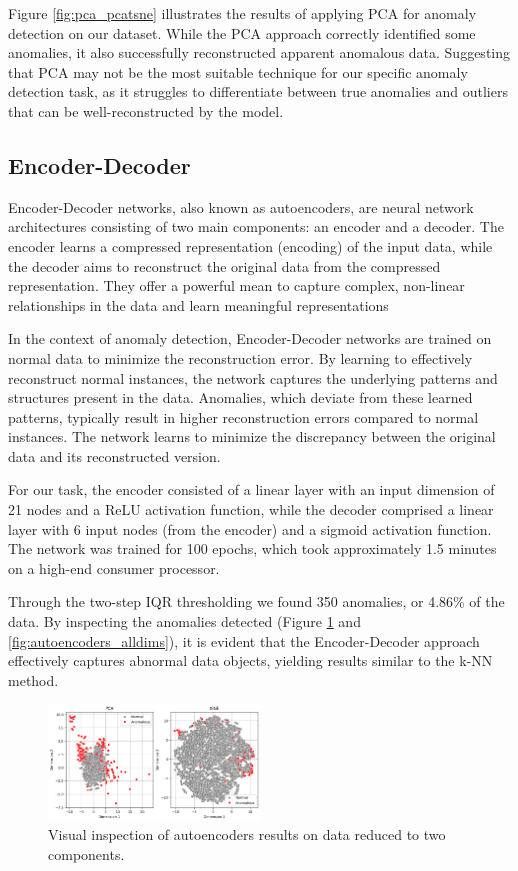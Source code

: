 \documentclass[9pt,twocolumn]{article}
\begin{document}
Figure \ref{fig:pca_pcatsne} illustrates the results of applying PCA for anomaly detection on our dataset. While the PCA approach correctly identified some anomalies, it also successfully reconstructed apparent anomalous data. Suggesting that PCA may not be the most suitable technique for our specific anomaly detection task, as it struggles to differentiate between true anomalies and outliers that can be well-reconstructed by the model.

\subsection {Encoder-Decoder}
Encoder-Decoder networks, also known as autoencoders, are neural network architectures consisting of two main components: an encoder and a decoder. The encoder learns a compressed representation (encoding) of the input data, while the decoder aims to reconstruct the original data from the compressed representation. They offer a powerful mean to capture complex, non-linear relationships in the data and learn meaningful representations

In the context of anomaly detection, Encoder-Decoder networks are trained on normal data to minimize the reconstruction error. By learning to effectively reconstruct normal instances, the network captures the underlying patterns and structures present in the data. Anomalies, which deviate from these learned patterns, typically result in higher reconstruction errors compared to normal instances.
The network learns to minimize the discrepancy between the original data and its reconstructed version.

For our task, the encoder consisted of a linear layer with an input dimension of 21 nodes and a ReLU activation function, while the decoder comprised a linear layer with 6 input nodes (from the encoder) and a sigmoid activation function. The network was trained for 100 epochs, which took approximately 1.5 minutes on a high-end consumer processor.

Through the two-step IQR thresholding we found 350 anomalies, or 4.86\% of the data. By inspecting the anomalies detected (Figure \ref{fig:autoencoders_PCATSNE} and \ref{fig:autoencoders_alldims}), it is evident that the Encoder-Decoder approach effectively captures abnormal data objects, yielding results similar to the k-NN method. 

\begin{figure}[h]
    \centering
    \includegraphics[width=0.5\textwidth]{images/ED_PCATSNE.png}
    \caption{Visual inspection of autoencoders results on data reduced to two components.}
    \label{fig:autoencoders_PCATSNE}
\end{figure}
\end{document}
